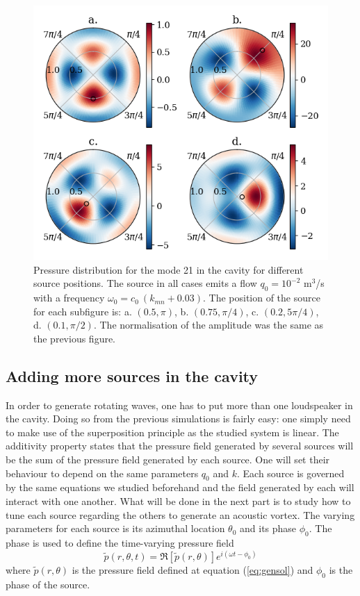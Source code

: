 \documentclass[%
 reprint,
 amsmath,amssymb,
 aps,
]{revtex4-2}
\begin{document}
\begin{figure}[h]
    \centering
    \includegraphics[width=.5\textwidth]{figures/source_pos.png}
    \caption{Pressure distribution for the mode 21 in the cavity for different source positions. The source in all cases emits a flow $q_0 = 10^{-2}$ m$^3$/s with a frequency $\omega_0 = c_0 \: (k_{mn} + 0.03)$. The position of the source for each subfigure is: a. $(0.5, \pi)$, b. $(0.75, \pi/4)$, c. $(0.2, 5 \pi/4)$, d. $(0.1, \pi/2)$. The normalisation of the amplitude was the same as the previous figure.}
    \label{fig:source_pos}
\end{figure}

\subsection{Adding more sources in the cavity}
In order to generate rotating waves, one has to put more than one loudspeaker in the cavity. Doing so from the previous simulations is fairly easy: one simply need to make use of the superposition principle as the studied system is linear. The additivity property states that the pressure field generated by several sources will be the sum of the pressure field generated by each source. One will set their behaviour to depend on the same parameters $q_0$ and $k$. Each source is governed by the same equations we studied beforehand and the field generated by each will interact with one another. What will be done in the next part is to study how to tune each source regarding the others to generate an acoustic vortex. The varying parameters for each source is its azimuthal location $\theta_0$ and its phase $\phi_0$. The phase is used to define the time-varying pressure field
\begin{equation}
    \tilde{p}(r, \theta, t) = \Re\left[\tilde{p}(r, \theta)\right] e^{i (\omega t - \phi_0)}
\end{equation}
where $\tilde{p}(r, \theta)$ is the pressure field defined at equation (\ref{eq:gensol}) and $\phi_0$ is the phase of the source.
\end{document}
